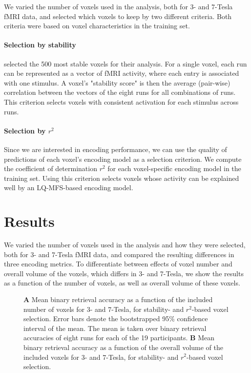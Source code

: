 We varied the number of voxels used in the analysis, both for 3- and 7-Tesla f{MRI} data,
and selected which voxels to keep by two different criteria. Both criteria were
based on voxel characteristics in the training set.  

\paragraph{Selection by stability}

\citet{ML08} selected the 500 most stable voxels for their analysis. For a
single voxel, each run can be represented as a vector of f{MRI} activity, where each
entry is associated with one stimulus. A voxel's "stability score" is then the
average (pair-wise) correlation between the vectors of the eight runs for all
combinations of runs.
This criterion selects voxels with consistent activation for each stimulus across runs.

\paragraph{Selection by $r^2$}

Since we are interested in encoding performance, we can use the quality of
predictions of each voxel's encoding model as a selection criterion. We compute
the coefficient of determination $r^2$ for each voxel-specific encoding model in
the training set. Using this criterion selects voxels whose activity can be explained well
by an LQ-MFS-based encoding model.

\section*{Results}

We varied the number of voxels used in the analysis and how they were selected,
both for 3- and 7-Tesla f{MRI} data, and compared the resulting differences in
three encoding metrics. To differentiate between effects of voxel number and
overall volume of the voxels, which differs in 3- and 7-Tesla, we show the results as a function of the number of voxels, as well as overall volume of
these voxels.

\begin{figure}
  \centering
  \def\svgwidth{\linewidth}
  
	
  \caption{\textbf{A} Mean binary retrieval accuracy as a function of the included number of
  voxels for 3- and 7-Tesla, for stability- and $r^2$-based voxel selection. Error bars denote the bootstrapped 95\% confidence
  interval of the mean. The mean is taken over binary retrieval accuracies of
  eight runs for each of the 19 participants. \textbf{B} Mean binary retrieval accuracy as a function of the overall volume of
	  the included voxels for 3- and 7-Tesla, for stability- and $r^2$-based voxel selection.}

 \label{fig:binary_retrieval}
\end{figure}

